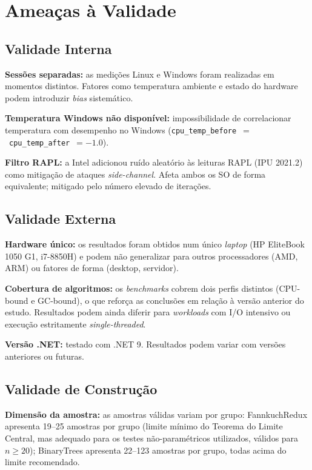 \documentclass[12pt,a4paper]{article}
\begin{document}
\section{Ameaças à Validade}
\label{sec:ameacas}

\subsection{Validade Interna}

\textbf{Sessões separadas:} as medições Linux e Windows foram realizadas em
momentos distintos.
Fatores como temperatura ambiente e estado do hardware podem introduzir
\textit{bias} sistemático.

\textbf{Temperatura Windows não disponível:} impossibilidade de correlacionar
temperatura com desempenho no Windows
(\texttt{cpu\_temp\_before}~$=$~\texttt{cpu\_temp\_after}~$=-1.0$).

\textbf{Filtro RAPL:} a Intel adicionou ruído aleatório às leituras RAPL
(IPU 2021.2) como mitigação de ataques \textit{side-channel}.
Afeta ambos os SO de forma equivalente; mitigado pelo número elevado de
iterações.

\subsection{Validade Externa}

\textbf{Hardware único:} os resultados foram obtidos num único \textit{laptop}
(HP EliteBook 1050 G1, i7-8850H) e podem não generalizar para outros
processadores (AMD, ARM) ou fatores de forma (desktop, servidor).

\textbf{Cobertura de algoritmos:} os \textit{benchmarks} cobrem dois perfis
distintos (CPU-bound e GC-bound), o que reforça as conclusões em relação à
versão anterior do estudo.
Resultados podem ainda diferir para \textit{workloads} com I/O intensivo ou
execução estritamente \textit{single-threaded}.

\textbf{Versão .NET:} testado com .NET 9.
Resultados podem variar com versões anteriores ou futuras.

\subsection{Validade de Construção}

\textbf{Dimensão da amostra:} as amostras válidas variam por grupo:
FannkuchRedux apresenta 19--25 amostras por grupo (limite mínimo do Teorema
do Limite Central, mas adequado para os testes não-paramétricos utilizados,
válidos para $n \geq 20$); BinaryTrees apresenta 22--123 amostras por grupo,
todas acima do limite recomendado.
\end{document}
